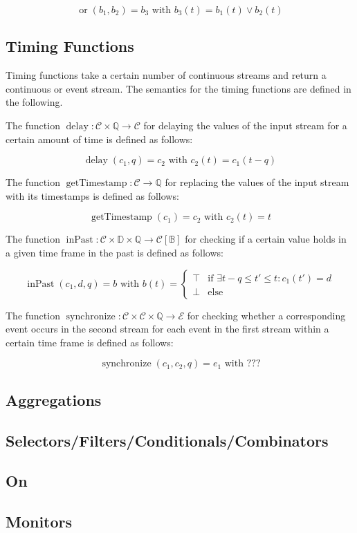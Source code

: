 \[\operatorname{or}(b_1, b_2) = b_3 \text{ with } b_3(t) = b_1(t) \lor b_2(t)\]

\subsection{Timing Functions}

Timing functions take a certain number of continuous streams and return a continuous or event stream. The semantics for the timing functions are defined in the following.

The function $\operatorname{delay}: \mathcal{C} \times \mathbb{Q} \rightarrow \mathcal{C}$ for delaying the values of the input stream for a certain amount of time is defined as follows:

\[\operatorname{delay}(c_1,q) = c_2 \text{ with } c_2(t) = c_1(t - q)\]

The function $\operatorname{getTimestamp}: \mathcal{C} \rightarrow \mathbb{Q}$ for replacing the values of the input stream with its timestamps is defined as follows:

\[\operatorname{getTimestamp}(c_1) = c_2 \text{ with } c_2(t) = t\]

The function $\operatorname{inPast}: \mathcal{C} \times \mathbb{D} \times \mathbb{Q} \rightarrow \mathcal{C}[\mathbb{B}]$ for checking if a certain value holds in a given time frame in the past is defined as follows:

\[\operatorname{inPast}(c_1, d, q) = b \text{ with } b(t) = \begin{cases}
\top & \text{if } \exists t - q \leq t' \leq t: c_1(t') = d \\
\bot & \text{else}
\end{cases}\]

The function $\operatorname{synchronize}: \mathcal{C} \times \mathcal{C} \times \mathbb{Q} \rightarrow \mathcal{E}$ for checking whether a corresponding event occurs in the second stream for each event in the first stream within a certain time frame is defined as follows:

\[\operatorname{synchronize}(c_1,c_2,q) = e_1 \text{ with } ???\]

\subsection{Aggregations}



\subsection{Selectors/Filters/Conditionals/Combinators}

\subsection{On}

\subsection{Monitors}